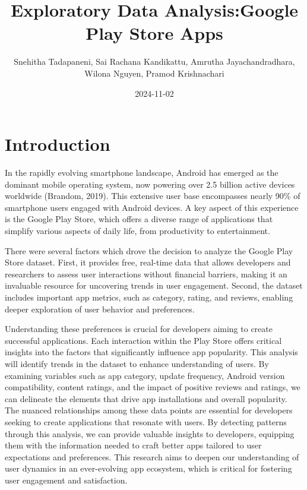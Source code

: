 \documentclass[
]{article}
\title{Exploratory Data Analysis:Google Play Store Apps}
\author{Snehitha Tadapaneni, Sai Rachana Kandikattu, Amrutha
Jayachandradhara, Wilona Nguyen, Pramod Krishnachari}
\date{2024-11-02}
\begin{document}
\maketitle

{
\setcounter{tocdepth}{2}
\tableofcontents
}
\section{\texorpdfstring{\textbf{Introduction}}{Introduction}}\label{introduction}

In the rapidly evolving smartphone landscape, Android has emerged as the
dominant mobile operating system, now powering over 2.5 billion active
devices worldwide (Brandom, 2019). This extensive user base encompasses
nearly 90\% of smartphone users engaged with Android devices. A key
aspect of this experience is the Google Play Store, which offers a
diverse range of applications that simplify various aspects of daily
life, from productivity to entertainment.

There were several factors which drove the decision to analyze the
Google Play Store dataset. First, it provides free, real-time data that
allows developers and researchers to assess user interactions without
financial barriers, making it an invaluable resource for uncovering
trends in user engagement. Second, the dataset includes important app
metrics, such as category, rating, and reviews, enabling deeper
exploration of user behavior and preferences.

Understanding these preferences is crucial for developers aiming to
create successful applications. Each interaction within the Play Store
offers critical insights into the factors that significantly influence
app popularity. This analysis will identify trends in the dataset to
enhance understanding of users. By examining variables such as app
category, update frequency, Android version compatibility, content
ratings, and the impact of positive reviews and ratings, we can
delineate the elements that drive app installations and overall
popularity. The nuanced relationships among these data points are
essential for developers seeking to create applications that resonate
with users. By detecting patterns through this analysis, we can provide
valuable insights to developers, equipping them with the information
needed to craft better apps tailored to user expectations and
preferences. This research aims to deepen our understanding of user
dynamics in an ever-evolving app ecosystem, which is critical for
fostering user engagement and satisfaction.
\end{document}
